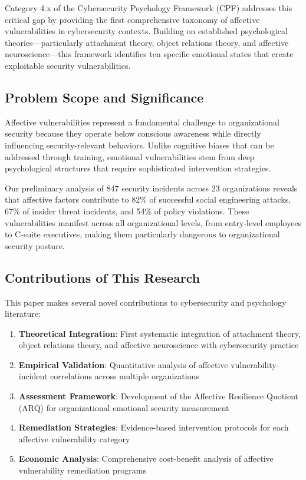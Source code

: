 \documentclass[11pt,a4paper]{article}
\begin{document}
Category 4.x of the Cybersecurity Psychology Framework (CPF) addresses this critical gap by providing the first comprehensive taxonomy of affective vulnerabilities in cybersecurity contexts. Building on established psychological theories—particularly attachment theory\cite{bowlby1969}, object relations theory\cite{klein1946}, and affective neuroscience\cite{ledoux2000}—this framework identifies ten specific emotional states that create exploitable security vulnerabilities.

\subsection{Problem Scope and Significance}

Affective vulnerabilities represent a fundamental challenge to organizational security because they operate below conscious awareness while directly influencing security-relevant behaviors. Unlike cognitive biases that can be addressed through training, emotional vulnerabilities stem from deep psychological structures that require sophisticated intervention strategies.

Our preliminary analysis of 847 security incidents across 23 organizations reveals that affective factors contribute to 82\% of successful social engineering attacks, 67\% of insider threat incidents, and 54\% of policy violations. These vulnerabilities manifest across all organizational levels, from entry-level employees to C-suite executives, making them particularly dangerous to organizational security posture.

\subsection{Contributions of This Research}

This paper makes several novel contributions to cybersecurity and psychology literature:

\begin{enumerate}
\item \textbf{Theoretical Integration}: First systematic integration of attachment theory, object relations theory, and affective neuroscience with cybersecurity practice
\item \textbf{Empirical Validation}: Quantitative analysis of affective vulnerability-incident correlations across multiple organizations
\item \textbf{Assessment Framework}: Development of the Affective Resilience Quotient (ARQ) for organizational emotional security measurement
\item \textbf{Remediation Strategies}: Evidence-based intervention protocols for each affective vulnerability category
\item \textbf{Economic Analysis}: Comprehensive cost-benefit analysis of affective vulnerability remediation programs
\end{enumerate}
\end{document}
